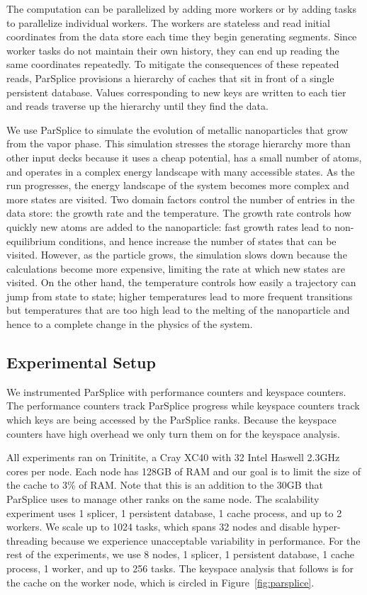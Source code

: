 The computation can be parallelized by adding more workers or by adding tasks
to parallelize individual workers.  The workers are stateless and read initial
coordinates from the data store each time they begin generating segments. Since
worker tasks do not maintain their own history, they can end up reading the
same coordinates repeatedly. To mitigate the consequences of these repeated
reads, ParSplice provisions a hierarchy of caches that sit in front of a single
persistent database.  Values corresponding to new keys are written to each tier
and reads traverse up the hierarchy until they find the data.

We use ParSplice to simulate the evolution of metallic nanoparticles that grow
from the vapor phase.  This simulation stresses the storage hierarchy more than
other input decks because it uses a cheap potential, has a small number of
atoms, and operates in a complex energy landscape with many accessible states.
As the run progresses, the energy landscape of the system becomes more complex
and more states are visited.  Two domain factors control the number of entries
in the data store: the growth rate and the temperature. The growth rate
controls how quickly new atoms are added to the nanoparticle: fast growth rates
lead to non-equilibrium conditions, and hence increase the number of states
that can be visited.  However, as the particle grows, the simulation slows down
because the calculations become more expensive, limiting the rate at which new
states are visited.  On the other hand, the temperature controls how easily a
trajectory can jump from state to state; higher temperatures lead to more
frequent transitions but temperatures that are too high lead to the melting of the
nanoparticle and hence to a complete change in the physics of the system.

\subsection{Experimental Setup}

We instrumented ParSplice with performance counters and keyspace counters.  The
performance counters track ParSplice progress while keyspace counters track
which keys are being accessed by the ParSplice ranks. Because the keyspace
counters have high overhead we only turn them on for the keyspace analysis.

All experiments ran on Trinitite, a Cray XC40 with 32 Intel Haswell 2.3GHz
cores per node.  Each node has 128GB of RAM and our goal is to limit the size
of the cache to 3\% of RAM. Note that this is an addition to the 30GB that
ParSplice uses to manage other ranks on the same node.  The scalability
experiment uses 1 splicer, 1 persistent database, 1 cache process, and up to 2
workers. We scale up to 1024 tasks, which spans 32 nodes and disable
hyper-threading because we experience unacceptable variability in performance.
For the rest of the experiments, we use 8 nodes, 1 splicer, 1 persistent
database, 1 cache process, 1 worker, and up to 256 tasks.  The keyspace
analysis that follows is for the cache on the worker node, which is circled in
Figure~\ref{fig:parsplice}.  


